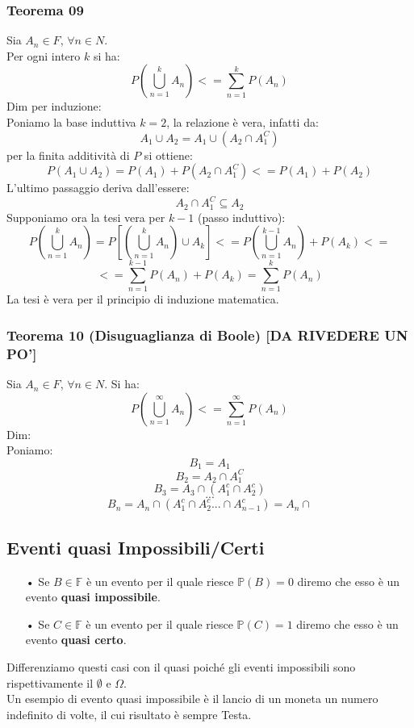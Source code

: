 \subsubsection{Teorema 09}
Sia $A_n \in F$, $\forall n \in N$.\\
Per ogni intero $k$ si ha:
$$ P(\bigcup_{n=1}^k A_n) <= \sum_{n=1}^k P(A_n) $$
Dim per induzione:\\
Poniamo la base induttiva $k=2$, la relazione è vera, infatti da:
$$ A_1 \cup A_2 = A_1 \cup (A_2 \cap A_1^C) $$
per la finita additività di $P$ si ottiene:
$$ P(A_1 \cup A_2) = P(A_1) + P(A_2 \cap A_1^C) <= P(A_1) + P(A_2) $$
L'ultimo passaggio deriva dall'essere:
$$ A_2 \cap A_1^C \subseteq A_2 $$
Supponiamo ora la tesi vera per $k-1$ (passo induttivo):
$$ P(\bigcup_{n=1}^k A_n) = P[(\bigcup_{n=1}^k A_n) \cup A_k ] <= P(\bigcup_{n=1}^{k-1} A_n)+P(A_k) <= $$
$$ <= \sum_{n=1}^{k-1} P(A_n) + P(A_k) = \sum_{n=1}^k P(A_n)$$
La tesi è vera per il principio di induzione matematica.

\subsubsection{Teorema 10 (Disuguaglianza di Boole) [DA RIVEDERE UN PO']}
Sia $A_n \in F$, $\forall n \in N$. Si ha:
$$  P(\bigcup_{n=1}^{\infty} A_n) <= \sum_{n=1}^{\infty} P(A_n) $$
Dim:\\
Poniamo:
$$ B_1 = A_1 $$
$$ B_2 = A_2 \cap A_1^C $$
$$ B_3 = A_3 \cap (A_1^c \cap A_2^c) $$
$$ ... $$
$$ B_n = A_n \cap (A_1^c \cap A_2^c ... \cap A_{n-1}^c) = A_n \cap $$

\subsection{Eventi quasi Impossibili/Certi}
\begin{itemize}
\item[•] Se $B \in \mathbb{F}$ è un evento per il quale riesce $\mathbb{P}(B) = 0$ diremo che esso è un evento \textbf{quasi impossibile}.
\item[•] Se $C \in \mathbb{F}$ è un evento per il quale riesce $\mathbb{P}(C) = 1$ diremo che esso è un evento \textbf{quasi certo}.
\end{itemize}
Differenziamo questi casi con il quasi poiché gli eventi impossibili sono rispettivamente il $\emptyset$ e $\Omega$.\\
Un esempio di evento quasi impossibile è il lancio di un moneta un numero indefinito di volte, il cui risultato è sempre Testa.

